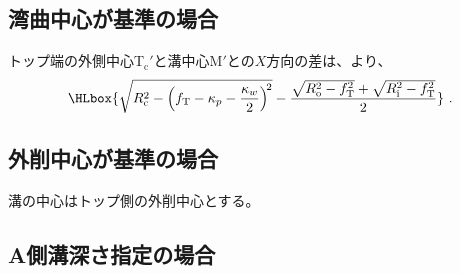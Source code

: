\subsection{湾曲中心が基準の場合}
トップ端の外側中心T$_\mathrm c'$と溝中心M$'$との$X$方向の差は、より、
\begin{align*}
  \HLbox{%
    \sqrt{R_\mathrm c^2-\left(f_\mathrm T-\kappa_p-\frac{\kappa_w}2\right)^{\!2}}
    -\frac{\sqrt{R_\mathrm o^2-f_\mathrm T^2}+\sqrt{R_\mathrm i^2-f_\mathrm T^2}}2%
  }\ .
\end{align*}


\subsection{外削中心が基準の場合}
溝の中心はトップ側の外削中心とする。


\subsection{A側溝深さ指定の場合}

